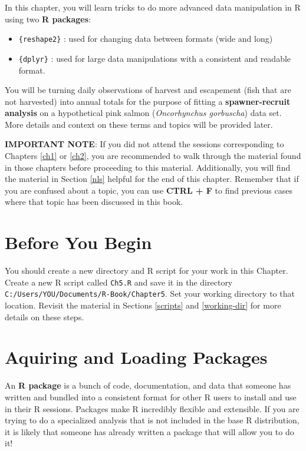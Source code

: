 \documentclass[]{book}
\providecommand{\tightlist}{%
  \setlength{\itemsep}{0pt}\setlength{\parskip}{0pt}}
\begin{document}
In this chapter, you will learn tricks to do more advanced data manipulation in R using two \textbf{R packages}:

\begin{itemize}
\tightlist
\item
  \texttt{\{reshape2\}} \citep{R-reshape2}: used for changing data between formats (wide and long)
\item
  \texttt{\{dplyr\}} \citep{R-dplyr}: used for large data manipulations with a consistent and readable format.
\end{itemize}

You will be turning daily observations of harvest and escapement (fish that are not harvested) into annual totals for the purpose of fitting a \textbf{spawner-recruit analysis} on a hypothetical pink salmon (\emph{Oncorhynchus gorbuscha}) data set. More details and context on these terms and topics will be provided later.

\textbf{IMPORTANT NOTE}: If you did not attend the sessions corresponding to Chapters \ref{ch1} or \ref{ch2}, you are recommended to walk through the material found in those chapters before proceeding to this material. Additionally, you will find the material in Section \ref{nls} helpful for the end of this chapter. Remember that if you are confused about a topic, you can use \textbf{CTRL + F} to find previous cases where that topic has been discussed in this book.

\hypertarget{before-you-begin-4}{%
\section*{Before You Begin}\label{before-you-begin-4}}

You should create a new directory and R script for your work in this Chapter. Create a new R script called \texttt{Ch5.R} and save it in the directory \texttt{C:/Users/YOU/Documents/R-Book/Chapter5}. Set your working directory to that location. Revisit the material in Sections \ref{scripts} and \ref{working-dir} for more details on these steps.

\hypertarget{aquiring-and-loading-packages}{%
\section{Aquiring and Loading Packages}\label{aquiring-and-loading-packages}}

An \textbf{R package} is a bunch of code, documentation, and data that someone has written and bundled into a consistent format for other R users to install and use in their R sessions. Packages make R incredibly flexible and extensible. If you are trying to do a specialized analysis that is not included in the base R distribution, it is likely that someone has already written a package that will allow you to do it!
\end{document}
